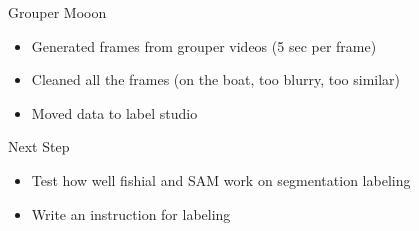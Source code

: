
\begin{frame}{Grouper Mooon}
    \begin{itemize}
        \item Generated frames from grouper videos (5 sec per frame)
        \item Cleaned all the frames (on the boat, too blurry, too similar)
        \item Moved data to label studio 
       
     \end{itemize}    

\end{frame}

\begin{frame}{Next Step}
    \begin{itemize}
        \item Test how well fishial and SAM work on segmentation labeling 
        \item Write an instruction for labeling
     \end{itemize}    

\end{frame}





